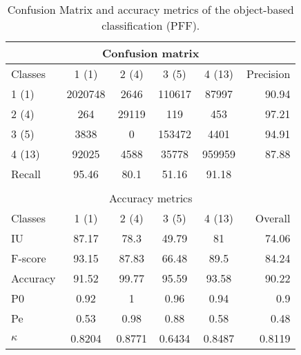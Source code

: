 \begin{table}[H]
\begin{center}
\footnotesize
\begin{tabular}{|l|c|c|c|c|r|}
\hline
\multicolumn{6}{|c|}{Confusion matrix} \\
\hline
 Classes & 1 (1) & 2 (4) & 3 (5) & 4 (13) & Precision \\
\hline
1 (1) & 2020748 & 2646 & 110617 & 87997 & 90.94 \\
\hline
2 (4) & 264 & 29119 & 119 & 453 & 97.21 \\
\hline
3 (5) & 3838 & 0 & 153472 & 4401 & 94.91 \\
\hline
4 (13) & 92025 & 4588 & 35778 & 959959 & 87.88 \\
\hline
Recall & 95.46 & 80.1 & 51.16 & 91.18 &  \\
\hline
\multicolumn{6}{c}{ } \\
\hline
\multicolumn{6}{|c|}{Accuracy metrics} \\
\hline
 Classes & 1 (1) & 2 (4) & 3 (5) & 4 (13) & Overall \\
\hline
IU & 87.17 & 78.3 & 49.79 & 81 & 74.06 \\
\hline
F-score & 93.15 & 87.83 & 66.48 & 89.5 & 84.24 \\
\hline
Accuracy & 91.52 & 99.77 & 95.59 & 93.58 & 90.22 \\
\hline
P0 & 0.92 & 1 & 0.96 & 0.94 & 0.9 \\
\hline
Pe & 0.53 & 0.98 & 0.88 & 0.58 & 0.48 \\
\hline
$\kappa$ & 0.8204 & 0.8771 & 0.6434 & 0.8487 & 0.8119 \\
\hline
\end{tabular}
\caption{Confusion Matrix and accuracy metrics of the object-based classification (PFF).}
\label{table:C3_S3_ss3_classif_PFF}
\end{center}
\end{table}